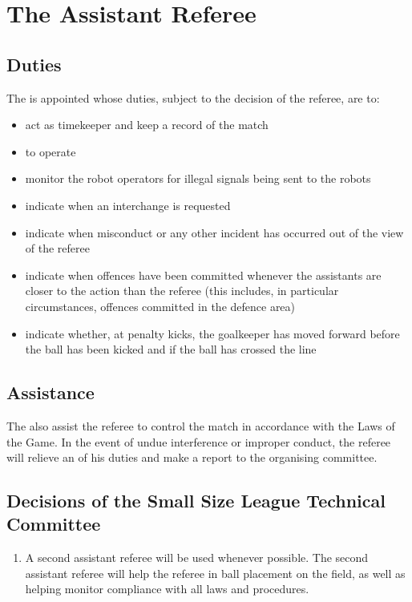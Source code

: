 \section{The Assistant Referee}\label{sec:assistant-referee}

\subsection{Duties}
The  is appointed whose duties, subject to the decision of the referee, are to:
\begin{itemize}
\item act as timekeeper and keep a record of the match
\item to operate  
\item monitor the robot operators for illegal signals being sent to the robots
\item indicate when an interchange is requested
\item indicate when misconduct or any other incident has occurred out of the view of the referee
\item indicate when offences have been committed whenever the assistants are closer to the action than the referee (this includes, in particular circumstances, offences committed in the defence area)
\item indicate whether, at penalty kicks, the goalkeeper has moved forward before the ball has been kicked and if the ball has crossed the line
\end{itemize}

\subsection{Assistance}
The  also assist the referee to control the match in accordance with the Laws of the Game.
In the event of undue interference or improper conduct, the referee will relieve an  of his duties and make a report to the organising committee.

\subsection*{Decisions of the Small Size League Technical Committee}
\begin{enumerate}
\item
A second assistant referee will be used whenever possible.
The second assistant referee will help the referee in ball placement on the field, as well as helping monitor compliance with all laws and procedures.
\end{enumerate}
